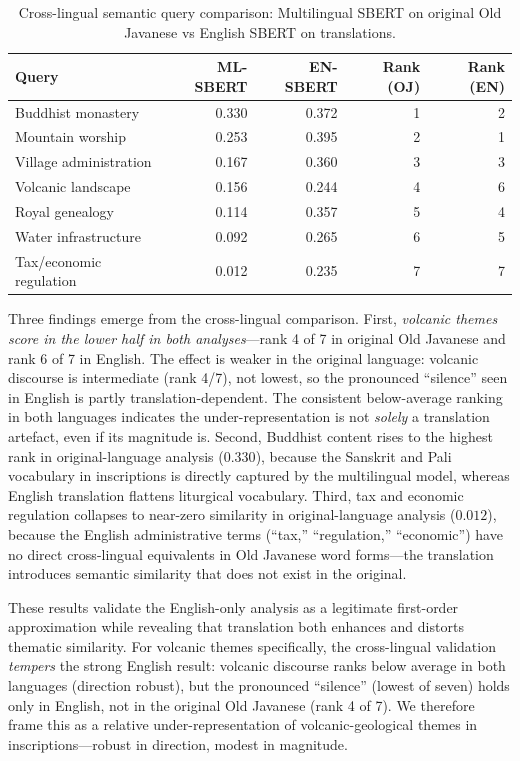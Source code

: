 \documentclass[12pt]{article}
\begin{document}
\begin{table}[htbp]
\centering
\caption{Cross-lingual semantic query comparison: Multilingual SBERT on original Old Javanese vs English SBERT on translations.}
\label{tab:crosslingual}
\begin{tabular}{lrrrr}
\toprule
\textbf{Query} & \textbf{ML-SBERT} & \textbf{EN-SBERT} & \textbf{Rank (OJ)} & \textbf{Rank (EN)} \\
\midrule
Buddhist monastery       & 0.330 & 0.372 & 1 & 2 \\
Mountain worship         & 0.253 & 0.395 & 2 & 1 \\
Village administration   & 0.167 & 0.360 & 3 & 3 \\
Volcanic landscape       & 0.156 & 0.244 & 4 & 6 \\
Royal genealogy          & 0.114 & 0.357 & 5 & 4 \\
Water infrastructure     & 0.092 & 0.265 & 6 & 5 \\
Tax/economic regulation  & 0.012 & 0.235 & 7 & 7 \\
\bottomrule
\end{tabular}
\end{table}

Three findings emerge from the cross-lingual comparison.
First, \emph{volcanic themes score in the lower half in both analyses}---rank 4 of 7 in original Old Javanese and rank 6 of 7 in English. The effect is weaker in the original language: volcanic discourse is intermediate (rank 4/7), not lowest, so the pronounced ``silence'' seen in English is partly translation-dependent. The consistent below-average ranking in both languages indicates the under-representation is not \emph{solely} a translation artefact, even if its magnitude is.
Second, Buddhist content rises to the highest rank in original-language analysis ($0.330$), because the Sanskrit and Pali vocabulary in inscriptions is directly captured by the multilingual model, whereas English translation flattens liturgical vocabulary.
Third, tax and economic regulation collapses to near-zero similarity in original-language analysis ($0.012$), because the English administrative terms (``tax,'' ``regulation,'' ``economic'') have no direct cross-lingual equivalents in Old Javanese word forms---the translation introduces semantic similarity that does not exist in the original.

These results validate the English-only analysis as a legitimate first-order approximation while revealing that translation both enhances and distorts thematic similarity.
For volcanic themes specifically, the cross-lingual validation \emph{tempers} the strong English result: volcanic discourse ranks below average in both languages (direction robust), but the pronounced ``silence'' (lowest of seven) holds only in English, not in the original Old Javanese (rank 4 of 7). We therefore frame this as a relative under-representation of volcanic-geological themes in inscriptions---robust in direction, modest in magnitude.
\end{document}
